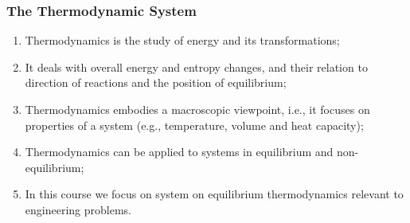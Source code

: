 \documentclass[10pt,compress]{beamer}
\begin{document}
\begin{frame}
 \frametitle{The Thermodynamic System}
  \begin{enumerate}[(1)]\scriptsize
   \item <1-> Thermodynamics is the study of energy and its transformations;
   \item <2-> It deals with overall energy and entropy changes, and their relation to direction of reactions and the position of equilibrium;
   \item <3-> Thermodynamics embodies a macroscopic viewpoint, i.e., it focuses on properties of a system (e.g., temperature, volume and heat capacity);
   \item <4-> Thermodynamics can be applied to systems in equilibrium and non-equilibrium;
   \item <5-> In this course we focus on system on equilibrium thermodynamics relevant to engineering problems.   
  \end{enumerate}
\end{frame}
\end{document}
